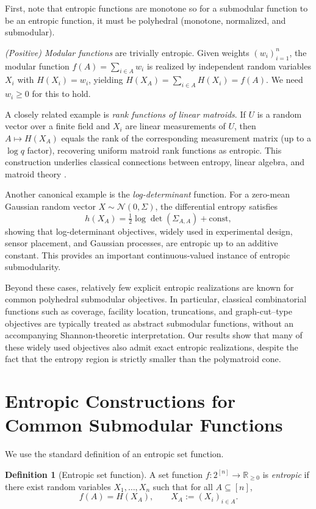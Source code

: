 \documentclass[conference]{IEEEtran}
\theoremstyle{definition}
\newtheorem{definition}{Definition}
\theoremstyle{remark}
\begin{document}
First, note that entropic functions are monotone so for a submodular function to be an entropic function, it must be polyhedral (monotone, normalized, and submodular). 

\emph{(Positive) Modular functions} are trivially entropic.
Given weights $(w_i)_{i=1}^n$, the modular function $f(A)=\sum_{i\in A} w_i$ is realized by independent random variables
$X_i$ with $H(X_i)=w_i$, yielding $H(X_A)=\sum_{i\in A} H(X_i)=f(A)$. We need $w_i \geq 0$ for this to hold. 

A closely related example is \emph{rank functions of linear matroids}.
If $U$ is a random vector over a finite field and $X_i$ are linear measurements of $U$, then
$A\mapsto H(X_A)$ equals the rank of the corresponding measurement matrix (up to a $\log q$ factor),
recovering uniform matroid rank functions as entropic.
This construction underlies classical connections between entropy, linear algebra, and matroid theory
\cite{Yeung2008}.

Another canonical example is the \emph{log-determinant} function.
For a zero-mean Gaussian random vector $X\sim \mathcal{N}(0,\Sigma)$, the differential entropy satisfies
\[
h(X_A)=\tfrac12 \log \det(\Sigma_{A,A}) + \text{const},
\]
showing that log-determinant objectives, widely used in experimental design, sensor placement, and Gaussian processes, 
are entropic up to an additive constant.
This provides an important continuous-valued instance of entropic submodularity.

Beyond these cases, relatively few explicit entropic realizations are known for common polyhedral submodular objectives.
In particular, classical combinatorial functions such as coverage, facility location, truncations, and graph-cut–type
objectives are typically treated as abstract submodular functions, without an accompanying Shannon-theoretic
interpretation.
Our results show that many of these widely used objectives also admit exact entropic realizations, despite the fact that
the entropy region is strictly smaller than the polymatroid cone.


\section{Entropic Constructions for Common Submodular Functions}
\label{sec:entropic_constructions}

We use the standard definition of an entropic set function.

\begin{definition}[Entropic set function]
A set function $f:2^{[n]}\to\mathbb{R}_{\ge 0}$ is \emph{entropic} if there exist random variables
$X_1,\dots,X_n$ such that for all $A\subseteq [n]$,
\[
f(A)=H(X_A),\qquad X_A := (X_i)_{i\in A}.
\]
\end{definition}
\end{document}
